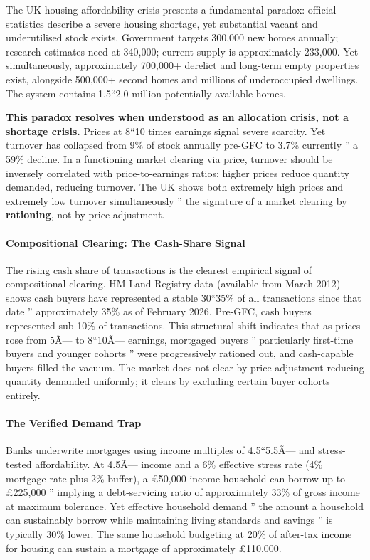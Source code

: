 \documentclass[
]{article}
\begin{document}
The UK housing affordability crisis presents a fundamental paradox:
official statistics describe a severe housing shortage, yet substantial
vacant and underutilised stock exists. Government targets 300,000 new
homes annually; research estimates need at 340,000; current supply is
approximately 233,000. Yet simultaneously, approximately 700,000+
derelict and long-term empty properties exist, alongside 500,000+ second
homes and millions of underoccupied dwellings. The system contains
1.5``2.0 million potentially available homes.

\textbf{This paradox resolves when understood as an allocation crisis,
not a shortage crisis.} Prices at 8``10 times earnings signal severe
scarcity. Yet turnover has collapsed from 9\% of stock annually pre-GFC
to 3.7\% currently '' a 59\% decline. In a functioning market clearing
via price, turnover should be inversely correlated with
price-to-earnings ratios: higher prices reduce quantity demanded,
reducing turnover. The UK shows both extremely high prices and extremely
low turnover simultaneously '' the signature of a market clearing by
\textbf{rationing}, not by price adjustment.

\paragraph{Compositional Clearing: The Cash-Share
Signal}\label{compositional-clearing-the-cash-share-signal}

The rising cash share of transactions is the clearest empirical signal
of compositional clearing. HM Land Registry data (available from March
2012) shows cash buyers have represented a stable 30``35\% of all
transactions since that date '' approximately 35\% as of February 2026.
Pre-GFC, cash buyers represented sub-10\% of transactions. This
structural shift indicates that as prices rose from 5Ã--- to 8``10Ã---
earnings, mortgaged buyers '' particularly first-time buyers and younger
cohorts '' were progressively rationed out, and cash-capable buyers
filled the vacuum. The market does not clear by price adjustment
reducing quantity demanded uniformly; it clears by excluding certain
buyer cohorts entirely.

\paragraph{The Verified Demand Trap}\label{the-verified-demand-trap}

Banks underwrite mortgages using income multiples of 4.5``5.5Ã--- and
stress-tested affordability. At 4.5Ã--- income and a 6\% effective
stress rate (4\% mortgage rate plus 2\% buffer), a £50,000-income
household can borrow up to £225,000 '' implying a debt-servicing ratio
of approximately 33\% of gross income at maximum tolerance. Yet
effective household demand '' the amount a household can sustainably
borrow while maintaining living standards and savings '' is typically
30\% lower. The same household budgeting at 20\% of after-tax income for
housing can sustain a mortgage of approximately £110,000.
\end{document}
